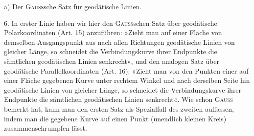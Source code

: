 \clearpage\begingroup\NoSourceHead{}
\renewcommand{\thefootnote}{\arabic{footnote})}\setcounter{footnote}{5}
\begin{center}\end{center}
\noindent\hspace*{\parindent}a) Der \textsc{Gauss}sche Satz für geodätische Linien.
\par\noindent\hspace*{\parindent}6. In erster Linie haben wir hier den \textsc{Gauss}schen Satz über geodätische
Polarkoordinaten (Art. 15) anzuführen: »Zieht man auf einer Fläche von demselben
Ausgangspunkt aus nach allen Richtungen geodätische Linien von
gleicher Länge, so schneidet die Verbindungskurve ihrer Endpunkte die sämtlichen
geodätischen Linien senkrecht«, und den analogen Satz über geodätische
Parallelkoordinaten (Art. 16): »Zieht man von den Punkten einer auf einer
Fläche gegebenen Kurve unter rechtem Winkel und nach derselben Seite hin
geodätische Linien von gleicher Länge, so schneidet die Verbindungskurve
ihrer Endpunkte die sämtlichen geodätischen Linien senkrecht«. Wie schon
\textsc{Gauss} bemerkt hat, kann man den ersten Satz als Spezialfall des zweiten
auffassen, indem man die gegebene Kurve auf einen Punkt (unendlich kleinen
Kreis) zusammenschrumpfen lässt.

